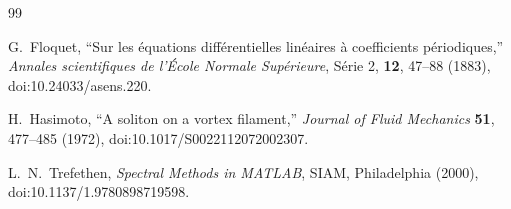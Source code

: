 \begin{thebibliography}{99}

G.~Floquet,
``Sur les équations différentielles linéaires à coefficients périodiques,''
\textit{Annales scientifiques de l'École Normale Supérieure}, Série 2,
\textbf{12}, 47--88 (1883),
doi:10.24033/asens.220.

H.~Hasimoto,
``A soliton on a vortex filament,''
\textit{Journal of Fluid Mechanics} \textbf{51}, 477--485 (1972),
doi:10.1017/S0022112072002307.

L.~N.~Trefethen,
\textit{Spectral Methods in MATLAB},
SIAM, Philadelphia (2000),
doi:10.1137/1.9780898719598.

\end{thebibliography}
